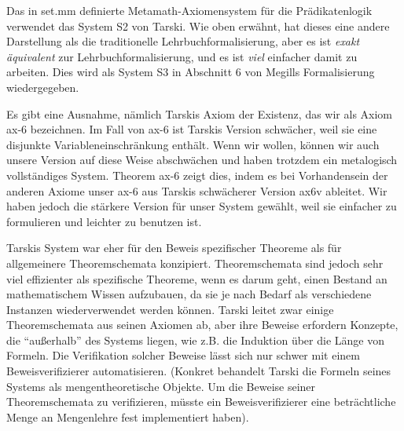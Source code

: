 Das in set.mm definierte Metamath-Axiomensystem für die Prädikatenlogik verwendet das System S2 von Tarski. Wie oben erwähnt, hat dieses eine andere Darstellung als die traditionelle Lehrbuchformalisierung, aber es ist \textit{exakt äquivalent} zur Lehrbuchformalisierung, und es ist \textit{viel} einfacher damit zu arbeiten. Dies wird als System S3 in Abschnitt 6 von Megills Formalisierung \cite{Megill} wiedergegeben.

Es gibt eine Ausnahme, nämlich Tarskis Axiom der Existenz, das wir als Axiom ax-6 bezeichnen. Im Fall von ax-6 ist Tarskis Version schwächer, weil sie eine disjunkte Variableneinschränkung enthält. Wenn wir wollen, können wir auch unsere Version auf diese Weise abschwächen und haben trotzdem ein metalogisch vollständiges System. Theorem ax-6 zeigt dies, indem es bei Vorhandensein der anderen Axiome unser ax-6 aus Tarskis schwächerer Version ax6v ableitet. Wir haben jedoch die stärkere Version für unser System gewählt, weil sie einfacher zu formulieren und leichter zu benutzen ist.

Tarskis System war eher für den Beweis spezifischer Theoreme als für allgemeinere Theoremschemata konzipiert. Theoremschemata sind jedoch sehr viel effizienter als spezifische Theoreme, wenn es darum geht, einen Bestand an mathematischem Wissen aufzubauen, da sie je nach Bedarf als verschiedene Instanzen wiederverwendet werden können. Tarski leitet zwar einige Theoremschemata aus seinen Axiomen ab, aber ihre Beweise erfordern Konzepte, die "`außerhalb"' des Systems liegen, wie z.B. die Induktion über die Länge von Formeln. Die Verifikation solcher Beweise lässt sich nur schwer mit einem Beweisverifizierer automatisieren. (Konkret behandelt Tarski die Formeln seines Systems als mengentheoretische Objekte. Um die Beweise seiner Theoremschemata zu verifizieren, müsste ein Beweisverifizierer eine beträchtliche Menge an Mengenlehre fest implementiert haben).

